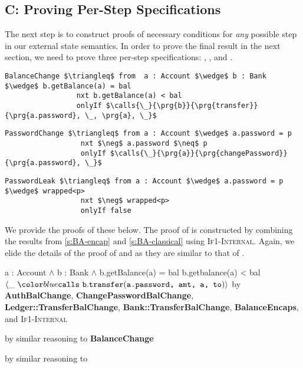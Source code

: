 \subsection{C: Proving Per-Step \Nec Specifications}
The next step is to construct proofs of necessary conditions for
\emph{any} possible step in our external state semantics.
In order to prove the final result in the next section,
we need to prove three per-step \Nec specifications: , , and .
\begin{lstlisting}[language = Chainmail, mathescape=true, frame=lines]
BalanceChange $\triangleq$ from  a : Account $\wedge$ b : Bank $\wedge$ b.getBalance(a) = bal
                 nxt b.getBalance(a) < bal
                 onlyIf $\calls{\_}{\prg{b}}{\prg{transfer}}{\prg{a.password}, \_, \prg{a}, \_}$
\end{lstlisting}
\begin{lstlisting}[language = Chainmail, mathescape=true, frame=lines]
PasswordChange $\triangleq$ from a : Account $\wedge$ a.password = p
                  nxt $\neg$ a.password $\neq$ p
                  onlyIf $\calls{\_}{\prg{a}}{\prg{changePassword}}{\prg{a.password}, \_}$
\end{lstlisting}
\begin{lstlisting}[language = Chainmail, mathescape=true, frame=lines]
PasswordLeak $\triangleq$ from a : Account $\wedge$ a.password = p $\wedge$ wrapped<p>
                  nxt $\neg$ wrapped<p>
                  onlyIf false
\end{lstlisting}
We provide the proofs of these below. The proof of  is constructed
by combining the results from \ref{s:BA-encap} and \ref{s:BA-classical} using \textsc{If1-Internal}. 
Again, we elide the details of the proof of  and  as they are similar to that
of . \\
\noindent
\begin{proofexample}
	{\proofstepwithrule
			{\onlyIfSingleEx
					{a : Account $\wedge$ b : Bank $\wedge$ b.getBalance(a) = bal}
					{b.getbalance(a) < bal}
					{$\calls{\_}{\prg{b}}{\prg{transfer}}{\prg{a.password, amt, a, to}}$}
					}
				{by \textbf{AuthBalChange}, \textbf{ChangePasswordBalChange}, \textbf{Ledger::TransferBalChange}, \textbf{Bank::TransferBalChange}, \textbf{BalanceEncaps}, and \textsc{If1-Internal}}
		}
\endproofsteps
\end{proofexample}
\begin{proofexample}
	{
			{by similar reasoning to \textbf{BalanceChange}}
	}
\endproofsteps
\end{proofexample}
\begin{proofexample}
	{
			{by similar reasoning to }
	}
\endproofsteps
\end{proofexample}
